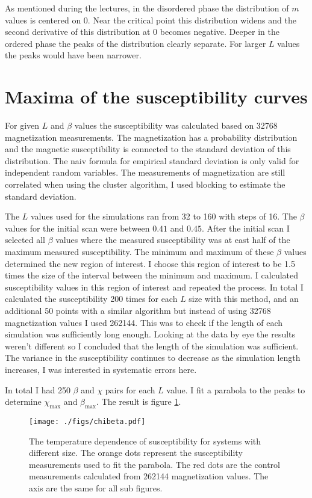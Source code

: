 \documentclass[pdftex,12pt,a4paper]{article}
\begin{document}
As mentioned during the lectures, in the disordered phase the distribution of $m$ values is centered on 0. Near the critical point this distribution widens and the second derivative of this distribution at 0 becomes negative. Deeper in the ordered phase the peaks of the distribution clearly separate. For larger $L$ values the peaks would have been narrower.

\section{Maxima of the susceptibility curves}

For given $L$ and $\beta$ values the susceptibility was calculated based on 32768 magnetization measurements. The magnetization has a probability distribution and the magnetic susceptibility is connected to the standard deviation of this distribution. The naiv formula for empirical standard deviation is only valid for independent random variables. The measurements of magnetization are still correlated when using the cluster algorithm, I used blocking to estimate the standard deviation. 

The $L$ values used for the simulations ran from 32 to 160 with steps of 16. The $\beta$ values for the initial scan were between $0.41$ and $0.45$. After the initial scan I selected all $\beta$ values where the measured susceptibility was at east half of the maximum measured susceptibility. The minimum and maximum of these $\beta$ values determined the new region of interest. I choose this region of interest to be 1.5 times the size of the interval between the minimum and maximum. I calculated susceptibility values in this region of interest and repeated the process. In total I calculated the susceptibility 200 times for each $L$ size with this method, and an additional 50 points with a similar algorithm but instead of using 32768 magnetization values I used 262144. This was to check if the length of each simulation was sufficiently long enough. Looking at the data by eye the results weren't different so I concluded that the length of the simulation was sufficient. The variance in the susceptibility continues to decrease as the simulation length increases, I was interested in systematic errors here.

In total I had 250 $\beta$ and $\chi$ pairs for each $L$ value. I fit a parabola to the peaks to determine $\chi_{\mathrm{max}}$ and $\beta_{\mathrm{max}}$. The result is figure \ref{chibeta}.

\begin{figure}[!h]
	\centering
	\texttt{[image: ./figs/chibeta.pdf]}
	\caption{The temperature dependence of susceptibility for systems with different size. The orange dots represent the susceptibility measurements used to fit the parabola. The red dots are the control measurements calculated from 262144 magnetization values. The axis are the same for all sub figures.}
	\label{chibeta}
\end{figure}
\end{document}
